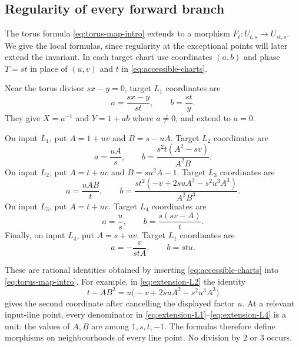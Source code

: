 \subsection{Regularity of every forward branch}

The torus formula \eqref{eq:torus-map-intro} extends to a morphism
\(F_t:U_{t,s}\to U_{st,s}\). We give the local formulas, since
regularity at the exceptional points will later extend the invariant.
In each target chart use coordinates \((a,b)\) and phase \(T=st\)
in place of \((u,v)\) and \(t\) in \eqref{eq:accessible-charts}.

Near the torus divisor \(sx-y=0\), target \(L_1\) coordinates are
\begin{equation}\label{eq:extension-torus}
a=\frac{sx-y}{st},\qquad b=\frac{st}{y}.
\end{equation}
They give \(X=a^{-1}\) and \(Y=1+ab\) where \(a\ne0\),
and extend to \(a=0\).

On input \(L_1\), put \(A=1+uv\) and \(B=s-uA\).
Target \(L_2\) coordinates are
\begin{equation}\label{eq:extension-L1}
a=\frac{uA}{s},\qquad
b=\frac{s^2t(A^2-sv)}{A^2B}.
\end{equation}
On input \(L_2\), put \(A=t+uv\) and \(B=su^2A-1\).
Target \(L_3\) coordinates are
\begin{equation}\label{eq:extension-L2}
a=\frac{uAB}{t},\qquad
b=\frac{st^2(-v+2suA^2-s^2u^3A^3)}{A^2B^3}.
\end{equation}
On input \(L_3\), put \(A=t+uv\). Target \(L_4\)
coordinates are
\begin{equation}\label{eq:extension-L3}
a=\frac us,\qquad b=\frac{s(sv-A)}t.
\end{equation}
Finally, on input \(L_4\), put \(A=s+uv\). Target \(L_1\)
coordinates are
\begin{equation}\label{eq:extension-L4}
a=-\frac{v}{stA},\qquad b=stu.
\end{equation}

These are rational identities obtained by inserting
\eqref{eq:accessible-charts} into \eqref{eq:torus-map-intro}.
For example, in \eqref{eq:extension-L2} the identity
\[
t-AB^2=u\bigl(-v+2suA^2-s^2u^3A^3\bigr)
\]
gives the second coordinate after cancelling the displayed factor
\(u\). At a relevant input-line point, every denominator in
\eqref{eq:extension-L1}--\eqref{eq:extension-L4} is a unit:
the values of \(A,B\) are among \(1,s,t,-1\).
The formulas therefore define morphisms on neighbourhoods of every
line point. No division by \(2\) or \(3\) occurs.

